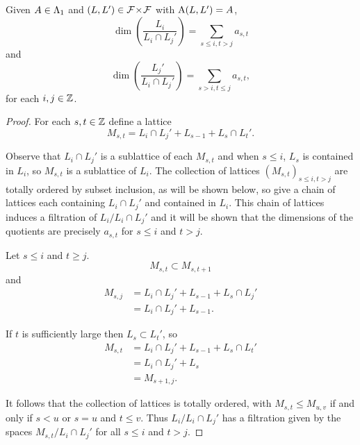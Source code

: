 \documentclass[a4paper, 11pt, twoside]{report}
\begin{document}
\begin{lemma}\label{lemma:hook-codimension-formula}
Given $A\in\Lambda_1{}$ and $(L,L')\in{\mathcal{F}\!\times\!\mathcal{F}}$ with $\operatorname{A}(L,L')=A$,
\begin{equation*}
\dim\left(\frac{L_i}{L_i\cap L_j'}\right) = \sum_{s\le i, t>j} a_{s,t}
\end{equation*}
and
\begin{equation*}
\dim\left(\frac{L_j'}{L_i\cap L_j'}\right) = \sum_{s>i,t\le j}a_{s,t},
\end{equation*}
for each $i,j\in\mathbb{Z}$.
\end{lemma}

\begin{proof}
For each $s,t\in\mathbb{Z}$ define a lattice
\begin{equation*}
M_{s,t} = L_i\cap L_j'+ L_{s-1} + L_s\cap L_t'.
\end{equation*}

Observe that $L_i\cap L_j'$ is a sublattice of each $M_{s,t}$ and when $s\le i$, $L_s$ is contained in $L_i$, so $M_{s,t}$ is a sublattice of $L_i$. The collection  of lattices ${(M_{s,t})}_{s\le i, t>j}$ are totally ordered by subset inclusion, as will be shown below, so give a chain of lattices each containing $L_i\cap L_j'$ and contained in $L_i$. This chain of lattices induces a filtration of $L_i/{L_i\cap L_j'}$ and it will be shown that the dimensions of the quotients are precisely $a_{s,t}$ for $s\le i$ and $t>j$.

Let $s\le i$ and $t\geq j$.
\begin{equation*}
M_{s,t}\subset M_{s,t+1}
\end{equation*}
and
\begin{align*}
M_{s,j}
&= L_i\cap L_j' + L_{s-1} +L_s\cap L_j'\\
&= L_i\cap L_j' + L_{s-1}.
\end{align*}

If $t$ is sufficiently large then $L_s\subset L_t'$, so
\begin{align*}
M_{s,t}
&= L_i\cap L_j' + L_{s-1} + L_s\cap L_t'\\
&= L_i\cap L_j' + L_s\\
&= M_{s+1,j}.
\end{align*}

It follows that the collection of lattices is totally ordered, with $M_{s,t}\le M_{u,v}$ if and only if $s<u$ or $s=u$ and $t\le v$. Thus $L_i/{L_i\cap L_j'}$ has a filtration given by the spaces $M_{s,t}/{L_i\cap L_j'}$ for all $s\le i$ and $t>j$.


\end{proof}
\end{document}

